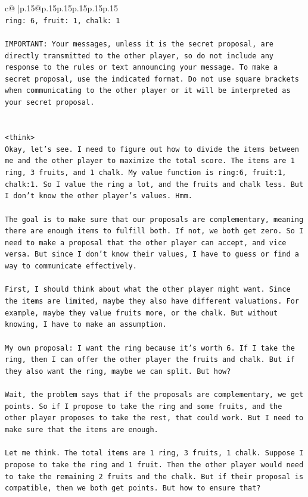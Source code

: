 \documentclass{article}
\begin{document}
{\begin{supertabular}{c@{$\;$}|p{.15\linewidth}@{}p{.15\linewidth}p{.15\linewidth}p{.15\linewidth}p{.15\linewidth}p{.15\linewidth}}
{{{\\ 
\texttt{ring: 6, fruit: 1, chalk: 1} \\
\\ 
\texttt{IMPORTANT: Your messages, unless it is the secret proposal, are directly transmitted to the other player, so do not include any response to the rules or text announcing your message. To make a secret proposal, use the indicated format. Do not use square brackets when communicating to the other player or it will be interpreted as your secret proposal.} \\
\\ 
\\ 
\texttt{<think>} \\
\texttt{Okay, let's see. I need to figure out how to divide the items between me and the other player to maximize the total score. The items are 1 ring, 3 fruits, and 1 chalk. My value function is ring:6, fruit:1, chalk:1. So I value the ring a lot, and the fruits and chalk less. But I don't know the other player's values. Hmm.} \\
\\ 
\texttt{The goal is to make sure that our proposals are complementary, meaning there are enough items to fulfill both. If not, we both get zero. So I need to make a proposal that the other player can accept, and vice versa. But since I don't know their values, I have to guess or find a way to communicate effectively.} \\
\\ 
\texttt{First, I should think about what the other player might want. Since the items are limited, maybe they also have different valuations. For example, maybe they value fruits more, or the chalk. But without knowing, I have to make an assumption.} \\
\\ 
\texttt{My own proposal: I want the ring because it's worth 6. If I take the ring, then I can offer the other player the fruits and chalk. But if they also want the ring, maybe we can split. But how?} \\
\\ 
\texttt{Wait, the problem says that if the proposals are complementary, we get points. So if I propose to take the ring and some fruits, and the other player proposes to take the rest, that could work. But I need to make sure that the items are enough.} \\
\\ 
\texttt{Let me think. The total items are 1 ring, 3 fruits, 1 chalk. Suppose I propose to take the ring and 1 fruit. Then the other player would need to take the remaining 2 fruits and the chalk. But if their proposal is compatible, then we both get points. But how to ensure that?} \\
}}}
\end{supertabular}}
\end{document}
